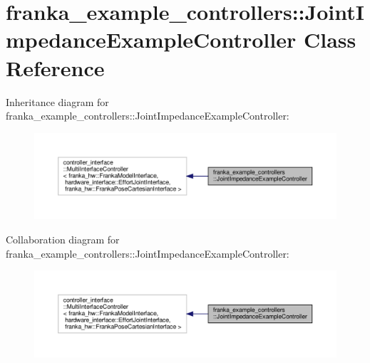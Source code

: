 \hypertarget{classfranka__example__controllers_1_1_joint_impedance_example_controller}{}\section{franka\+\_\+example\+\_\+controllers\+:\+:Joint\+Impedance\+Example\+Controller Class Reference}
\label{classfranka__example__controllers_1_1_joint_impedance_example_controller}


Inheritance diagram for franka\+\_\+example\+\_\+controllers\+:\+:Joint\+Impedance\+Example\+Controller\+:
\nopagebreak
\begin{figure}[H]
\begin{center}
\leavevmode
\includegraphics[width=350pt]{classfranka__example__controllers_1_1_joint_impedance_example_controller__inherit__graph}
\end{center}
\end{figure}


Collaboration diagram for franka\+\_\+example\+\_\+controllers\+:\+:Joint\+Impedance\+Example\+Controller\+:
\nopagebreak
\begin{figure}[H]
\begin{center}
\leavevmode
\includegraphics[width=350pt]{classfranka__example__controllers_1_1_joint_impedance_example_controller__coll__graph}
\end{center}
\end{figure}
